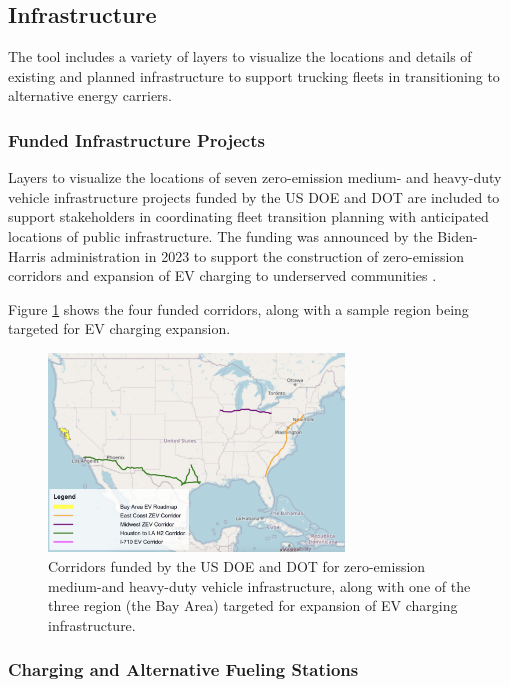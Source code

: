 \subsection{Infrastructure}

The tool includes a variety of layers to visualize the locations and details of existing and planned infrastructure to support trucking fleets in transitioning to alternative energy carriers. 

\subsubsection{Funded Infrastructure Projects}

Layers to visualize the locations of seven zero-emission medium- and heavy-duty vehicle infrastructure projects funded by the US DOE and DOT are included to support stakeholders in coordinating fleet transition planning with anticipated locations of public infrastructure. The funding was announced by the Biden-Harris administration in 2023 to support the construction of zero-emission corridors and expansion of EV charging to underserved communities \cite{biden_harris_2023}. 

Figure \ref{fig:infra_projects} shows the four funded corridors, along with a sample region being targeted for EV charging expansion. 

\begin{figure}[ht]
        \centering
        \includegraphics[width=0.7\textwidth]{figures/infra_projects.png}
        \caption{Corridors funded by the US DOE and DOT for zero-emission medium-and heavy-duty vehicle infrastructure, along with one of the three region (the Bay Area) targeted for expansion of EV charging infrastructure. }
        \label{fig:infra_projects}
\end{figure}

\subsubsection{Charging and Alternative Fueling Stations}

